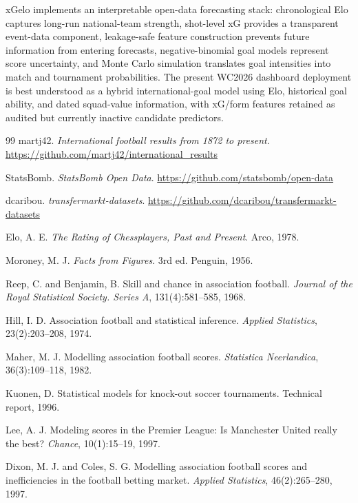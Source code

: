 \documentclass[11pt]{article}
\begin{document}
xGelo implements an interpretable open-data forecasting stack: chronological Elo
captures long-run national-team strength, shot-level xG provides a transparent
event-data component, leakage-safe feature construction prevents future
information from entering forecasts, negative-binomial goal models represent
score uncertainty, and Monte Carlo simulation translates goal intensities into
match and tournament probabilities. The present WC2026 dashboard deployment is
best understood as a hybrid international-goal model using Elo, historical goal
ability, and dated squad-value information, with xG/form features retained as
audited but currently inactive candidate predictors.

\begin{thebibliography}{99}
martj42. \emph{International football results from 1872 to present}.
\url{https://github.com/martj42/international_results}

StatsBomb. \emph{StatsBomb Open Data}.
\url{https://github.com/statsbomb/open-data}

dcaribou. \emph{transfermarkt-datasets}.
\url{https://github.com/dcaribou/transfermarkt-datasets}

Elo, A. E. \emph{The Rating of Chessplayers, Past and Present}. Arco, 1978.

Moroney, M. J. \emph{Facts from Figures}. 3rd ed. Penguin, 1956.

Reep, C. and Benjamin, B. Skill and chance in association football.
\emph{Journal of the Royal Statistical Society. Series A}, 131(4):581--585,
1968.

Hill, I. D. Association football and statistical inference.
\emph{Applied Statistics}, 23(2):203--208, 1974.

Maher, M. J. Modelling association football scores. \emph{Statistica
Neerlandica}, 36(3):109--118, 1982.

Kuonen, D. Statistical models for knock-out soccer tournaments. Technical
report, 1996.

Lee, A. J. Modeling scores in the Premier League: Is Manchester United really
the best? \emph{Chance}, 10(1):15--19, 1997.

Dixon, M. J. and Coles, S. G. Modelling association football scores and
inefficiencies in the football betting market. \emph{Applied Statistics},
46(2):265--280, 1997.


\end{thebibliography}
\end{document}
